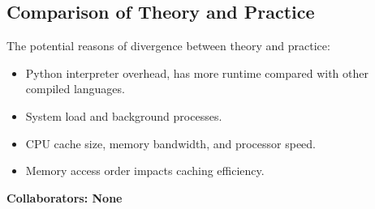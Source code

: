 \documentclass[12 pt]{article}
\begin{document}
\subsection*{Comparison of Theory and Practice}
The potential reasons of divergence between theory and practice:
    \begin{itemize}
        \item Python interpreter overhead, has more runtime compared with other compiled languages.
        \item System load and background processes.
        \item CPU cache size, memory bandwidth, and processor speed.
        \item Memory access order impacts caching efficiency.
    \end{itemize}


\noindent\textbf{Collaborators: None}
\end{document}
